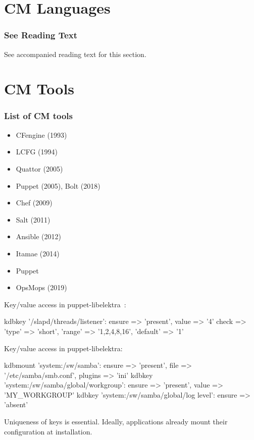 

\section{CM Languages}

\begin{frame}
	\frametitle{See Reading Text}

	See accompanied reading text for this section.
\end{frame}


\section{CM Tools}

\begin{frame}
	\frametitle{List of CM tools}

	\begin{itemize}[<+-| alert@+>]
	\item CFengine (1993)
	\item LCFG (1994)
	\item Quattor (2005)
	\item Puppet (2005), Bolt (2018)
	\item Chef (2009)
	\item Salt (2011)
	\item Ansible (2012)
	\item Itamae (2014)
	\item Puppet 
	\item OpsMops (2019)
	\end{itemize}
\end{frame}

\begin{frame}[fragile]
	Key/value access in puppet-libelektra~\cite{raab2020unified}:
	\vspace{0.5cm}

	\begin{code}[morekeywords={kdbkey,kdbmount,ensure,value},gobble=4]
	kdbkey {'/slapd/threads/listener':
		ensure => 'present',
		value => '4'
		check => {
			'type' => 'short',
			'range' => '1,2,4,8,16',
			'default' => '1'
		}
	}
	\end{code}
\end{frame}

\begin{frame}[fragile]
	Key/value access in puppet-libelektra:

	\begin{code}[morekeywords={kdbkey,kdbmount,ensure,value},gobble=4]
	kdbmount {'system:/sw/samba':
		ensure => 'present',
		file => '/etc/samba/smb.conf',
		plugins => 'ini'
	}
	kdbkey {'system:/sw/samba/global/workgroup':
		ensure => 'present',
		value => 'MY_WORKGROUP'
	}
	kdbkey {'system:/sw/samba/global/log level':
		ensure => 'absent'
	}
	\end{code}

	Uniqueness of keys is essential.
	Ideally, applications already mount their configuration at installation.
\end{frame}


